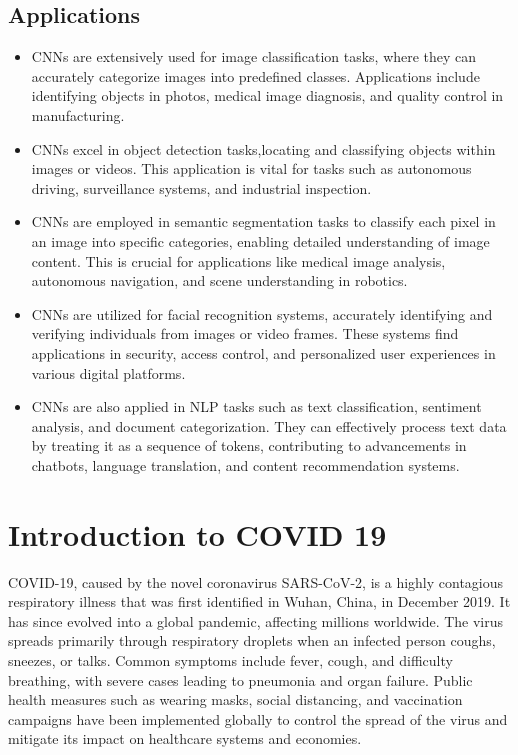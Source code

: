 \documentclass[12pt, a4paper]{report}
\begin{document}
\subsection{Applications}
\begin{itemize}
    \item \text CNNs are extensively used for image classification tasks, where they can accurately categorize images into predefined classes. Applications include identifying objects in photos, medical image diagnosis, and quality control in manufacturing.
    \item \text CNNs excel in object detection tasks,locating and classifying objects within images or videos. This application is vital for tasks such as autonomous driving, surveillance systems, and industrial inspection.
    \item \text CNNs are employed in semantic segmentation tasks to classify each pixel in an image into specific categories, enabling detailed understanding of image content. This is crucial for applications like medical image analysis, autonomous navigation, and scene understanding in robotics.
    \item \text CNNs are utilized for facial recognition systems, accurately identifying and verifying individuals from images or video frames. These systems find applications in security, access control, and personalized user experiences in various digital platforms.
    \item \text CNNs are also applied in NLP tasks such as text classification, sentiment analysis, and document categorization. They can effectively process text data by treating it as a sequence of tokens, contributing to advancements in chatbots, language translation, and content recommendation systems.
\end{itemize}

\section{Introduction to COVID 19}
COVID-19, caused by the novel coronavirus SARS-CoV-2, is a highly contagious respiratory illness that was first identified in Wuhan, China, in December 2019. It has since evolved into a global pandemic, affecting millions worldwide. The virus spreads primarily through respiratory droplets when an infected person coughs, sneezes, or talks. Common symptoms include fever, cough, and difficulty breathing, with severe cases leading to pneumonia and
organ failure. Public health measures such as wearing masks, social distancing, and vaccination campaigns have been implemented globally to control the spread of the virus and mitigate its impact on healthcare systems and economies.
\end{document}
